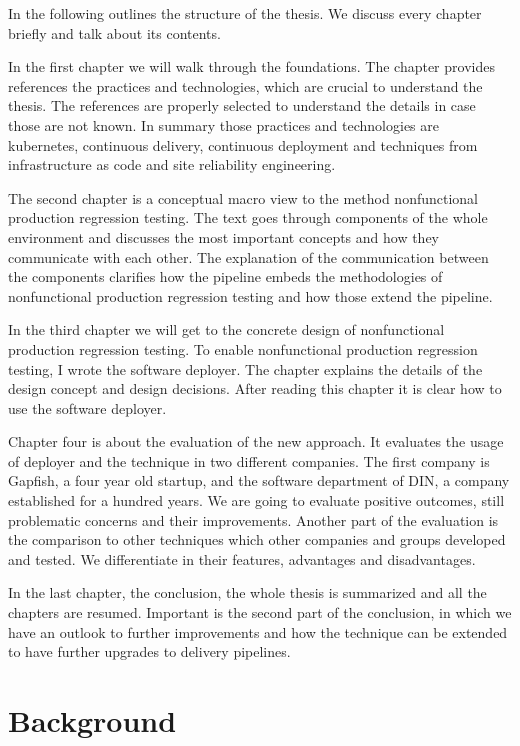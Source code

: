 In the following outlines the structure of the thesis. We discuss every chapter briefly
and talk about its contents.

In the first chapter we will walk through the foundations. The chapter provides references
the practices and technologies, which are crucial to understand the thesis. The references
are properly selected to understand the details in case those are not known. In summary
those practices and technologies are kubernetes, continuous delivery, continuous
deployment and techniques from infrastructure as code and site reliability engineering.

The second chapter is a conceptual macro view to the method nonfunctional production
regression testing. The text goes through components of the whole environment and
discusses the most important concepts and how they communicate with each other. The
explanation of the communication between the components clarifies how the pipeline embeds
the methodologies of nonfunctional production regression testing and how those extend the
pipeline.

In the third chapter we will get to the concrete design of nonfunctional production
regression testing. To enable nonfunctional production regression testing, I wrote the
software deployer.  The chapter explains the details of the design concept and design
decisions. After reading this chapter it is clear how to use the software deployer.

Chapter four is about the evaluation of the new approach. It evaluates the usage of
deployer and the technique in two different companies. The first company is Gapfish, a
four year old startup, and the software department of DIN, a company established for a
hundred years. We are going to evaluate positive outcomes, still problematic concerns and
their improvements. Another part of the evaluation is the comparison to other techniques
which other companies and groups developed and tested. We differentiate in their features,
advantages and disadvantages.

In the last chapter, the conclusion, the whole thesis is summarized and all the chapters
are resumed. Important is the second part of the conclusion, in which we have an outlook
to further improvements and how the technique can be extended to have further upgrades to
delivery pipelines.

\chapter{Background}

